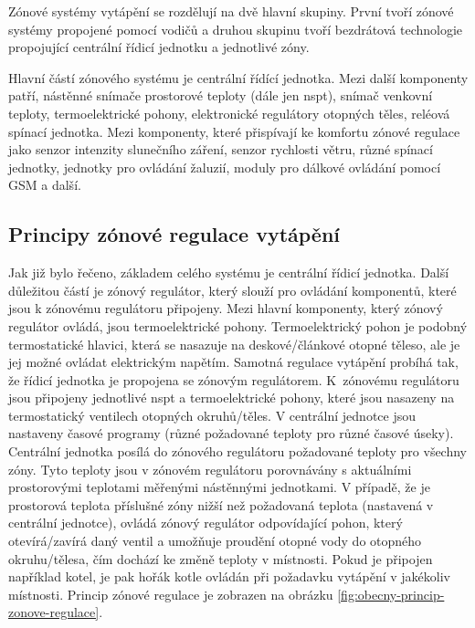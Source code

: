 Zónové systémy vytápění se rozdělují na dvě hlavní skupiny. První tvoří zónové systémy propojené pomocí vodičů a druhou skupinu tvoří bezdrátová technologie propojující centrální řídicí jednotku a jednotlivé zóny. \cite{matz-zonove-regulacni-systemy-a-jejich-vyuziti-pri-uspornem-efektivnim-vytapeni} 

Hlavní částí zónového systému je centrální řídící jednotka. Mezi další komponenty patří, nástěnné snímače prostorové teploty (dále jen \acrshort{nspt}), snímač venkovní teploty, termoelektrické pohony, elektronické regulátory otopných těles, reléová spínací jednotka. Mezi komponenty, které přispívají ke komfortu zónové regulace jako senzor intenzity slunečního záření, senzor rychlosti větru, různé spínací jednotky, jednotky pro ovládání žaluzií, moduly pro dálkové ovládání pomocí GSM a další. \cite{matz-zonove-regulacni-systemy-a-jejich-vyuziti-pri-uspornem-efektivnim-vytapeni}

\subsection{Principy zónové regulace vytápění}

Jak již bylo řečeno, základem celého systému je centrální řídicí jednotka. Další důležitou částí je zónový regulátor, který slouží pro ovládání komponentů, které jsou k zónovému regulátoru připojeny. Mezi hlavní komponenty, který zónový regulátor ovládá, jsou termoelektrické pohony. Termoelektrický pohon je podobný termostatické hlavici, která se nasazuje na deskové/článkové otopné těleso, ale je jej možné ovládat elektrickým napětím. Samotná regulace vytápění probíhá tak, že řídicí jednotka je propojena se zónovým regulátorem. K~zónovému regulátoru jsou připojeny jednotlivé \acrshort{nspt} a termoelektrické pohony, které jsou nasazeny na termostatický ventilech otopných okruhů/těles. V centrální jednotce jsou nastaveny časové programy (různé požadované teploty pro různé časové úseky). Centrální jednotka posílá do zónového regulátoru požadované teploty pro všechny zóny. Tyto  teploty jsou v zónovém regulátoru porovnávány s aktuálními prostorovými teplotami měřenými nástěnnými jednotkami. V případě, že je prostorová teplota příslušné zóny nižší než požadovaná teplota (nastavená v centrální jednotce), ovládá zónový regulátor odpovídající pohon, který otevírá/zavírá daný ventil a umožňuje proudění otopné vody do otopného okruhu/tělesa, čím dochází ke změně teploty v místnosti. Pokud je připojen například kotel, je pak hořák kotle ovládán při požadavku vytápění v jakékoliv místnosti. Princip zónové regulace je zobrazen na obrázku \ref{fig:obecny-princip-zonove-regulace}. \cite{matz-zonove-regulacni-systemy-a-jejich-vyuziti-pri-uspornem-efektivnim-vytapeni}

